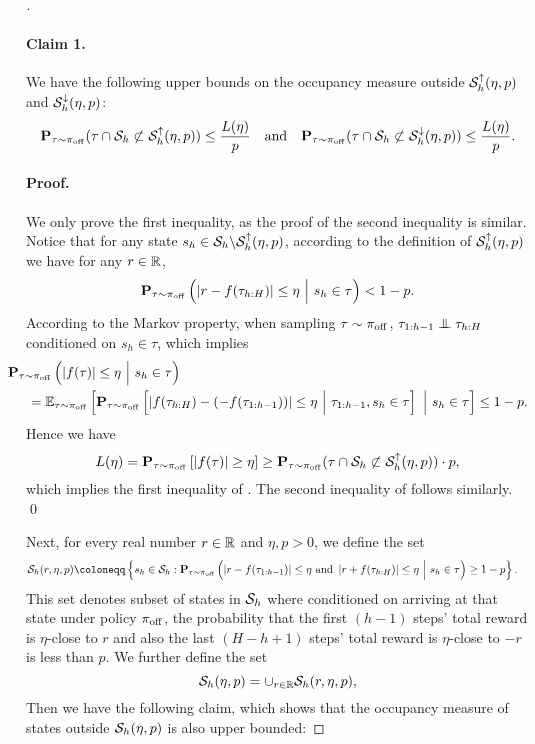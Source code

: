 \documentclass{article}
\let\oldparagraph\paragraph
\renewcommand{\paragraph}[1]{\oldparagraph{#1.}}
\begin{document}
\begin{proof}[]
    \paragraph{Claim 1} We have the following upper bounds on the occupancy measure outside $\mathcal{S}_h^\uparrow (\eta, p)$ and  $\mathcal{S}_h^\downarrow(\eta, p)$:
    \begin{equation}\label{eq:s-up-down}
        \mathbf{P}_{\tau\sim \pi_{\mathrm{off}}}(\tau \cap \mathcal{S}_h \not\subset \mathcal{S}_h^\uparrow(\eta, p))\le \frac{L(\eta)}{p}\quad\text{and}\quad \mathbf{P}_{\tau\sim \pi_{\mathrm{off}}}(\tau\cap \mathcal{S}_h\not\subset  \mathcal{S}_h^\downarrow(\eta, p))\le \frac{L(\eta)}{p}.
    \end{equation}

    \paragraph{Proof} We only prove the first inequality, as the proof of the second inequality is similar. Notice that for any state $s_h\in \mathcal{S}_h\backslash \mathcal{S}_h^\uparrow(\eta, p)$, according to the definition of $\mathcal{S}_h^\uparrow(\eta, p)$ we have for any $r\in \mathbb{R}$,
    \[\mathbf{P}_{\tau\sim \pi_{\mathrm{off}}}\left(\left|r - f(\tau_{h:H})\right|\le \eta\ \Big{|}\ s_h\in \tau\right) < 1 - p.\]
    According to the Markov property, when sampling $\tau\sim \pi_{\mathrm{off}}$, $\tau_{1:h-1}\perp\kern-6pt \perp \tau_{h:H}$ conditioned on $s_h \in \tau$, which implies
    \begin{align*} 
        &\hspace{-0.5cm} \bP_{\tau\sim \pioff}\left(\left|f(\tau)\right|\le \eta\ \Big{|}\ s_h\in \tau\right)\\
        & = \EE_{\tau\sim \pioff}\left[\bP_{\tau\sim \pioff}\left[\left|f(\tau_{h:H}) - \left(-f(\tau_{1:h-1})\right)\right|\le \eta\ \Big{|}\ \tau_{1:h-1}, s_h\in \tau\right]\ \Big{|}\  s_h\in \tau\right]\le 1 - p.
    \end{align*}
    Hence we have
    \[L(\eta) = \mathbf{P}_{\tau\sim \pi_{\mathrm{off}}}\left[|f(\tau)|\ge \eta\right]\ge \mathbf{P}_{\tau\sim \pi_{\mathrm{off}}}(\tau\cap \mathcal{S}_h\not\subset \mathcal{S}_h^\uparrow(\eta, p))\cdot p,\]
    which implies the first inequality of . The second inequality of  follows similarly. \qed
    
    Next, for every real number $r\in \mathbb{R}$ and $\eta, p > 0$, we define the set 
    \begin{align*} 
        \calS_h(r, \eta, p) &\coloneqq \left\{s_h\in \calS_h: \bP_{\tau\sim \pioff}\left(\left|r - f(\tau_{1:h-1})\right|\le \eta\  \text{and}\  \left|r + f(\tau_{h: H})\right|\le \eta\ \Big{|}\ s_h\in \tau\right)\ge 1 - p\right\}.
    \end{align*}
    This set denotes subset of states in $\mathcal{S}_h$ where conditioned on arriving at that state under policy $\pi_{\mathrm{off}}$, the probability that the first $(h-1)$ steps' total reward is $\eta$-close to $r$ and also the last $(H-h+1)$ steps' total reward is $\eta$-close to $-r$ is less than $p$. We further define the set
    \[\mathcal{S}_h(\eta, p) = \cup_{r\in \mathbb{R}} \mathcal{S}_h(r, \eta, p),\]
    Then we have the following claim, which shows that the occupancy measure of states outside $\mathcal{S}_h(\eta, p)$ is also upper bounded:

\end{proof}
\end{document}
